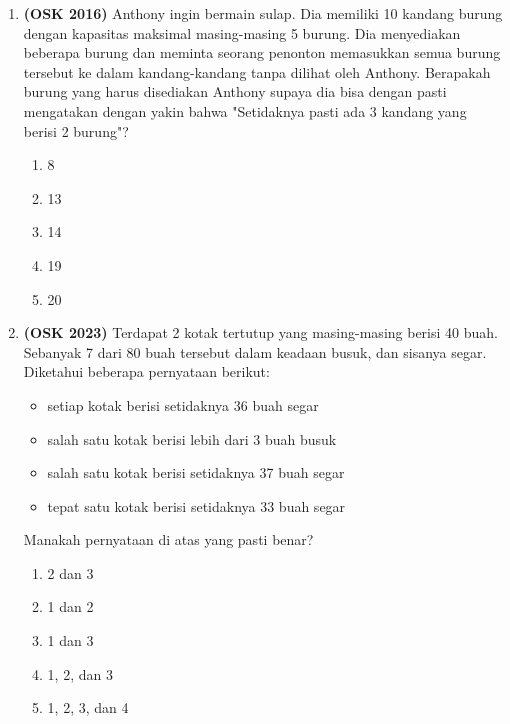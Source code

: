\documentclass[a4paper]{article}
\begin{document}
\begin{enumerate}
    Untuk memastikan bahwa ia mendapatkan ketiga kelereng itu, minimal berapa butir kelereng yang harus ia ambil dari keranjang?
    \begin{multicols}{5}
    \begin{enumerate}[label=\Alph*.]
        \item 3
        \item 5
        \item 7
        \item 9
        \item 11
    \end{enumerate}
  \end{multicols}
    \item\textbf{(OSK 2016)} Anthony ingin bermain sulap. Dia memiliki 10 kandang burung dengan kapasitas maksimal masing-masing 5 burung. Dia menyediakan beberapa burung dan meminta seorang penonton memasukkan semua burung tersebut ke dalam kandang-kandang tanpa dilihat oleh Anthony. 
    Berapakah burung yang harus disediakan Anthony supaya dia bisa dengan pasti mengatakan dengan yakin bahwa "Setidaknya pasti ada 3 kandang yang berisi 2 burung"?
    \begin{multicols}{5}
    \begin{enumerate}[label=\Alph*.]
        \item 8
        \item 13
        \item 14
        \item 19
        \item 20
    \end{enumerate}
  \end{multicols}
    \item\textbf{(OSK 2023)} Terdapat 2 kotak tertutup yang masing-masing berisi 40 buah. Sebanyak 7 dari 80 buah tersebut dalam keadaan busuk, dan sisanya segar. Diketahui beberapa pernyataan berikut:
    \begin{itemize}
      \item setiap kotak berisi setidaknya 36 buah segar
      \item salah satu kotak berisi lebih dari 3 buah busuk
      \item salah satu kotak berisi setidaknya 37 buah segar
      \item tepat satu kotak berisi setidaknya 33 buah segar
    \end{itemize}
    Manakah pernyataan di atas yang pasti benar?
    
    \begin{enumerate}[label=\Alph*.]
      \item 2 dan 3
      \item 1 dan 2
      \item 1 dan 3
      \item 1, 2, dan 3
      \item 1, 2, 3, dan 4
    \end{enumerate}


\end{enumerate}
\end{document}
